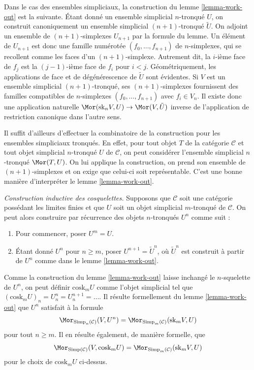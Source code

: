 \begin{remark}
\label{remark-cosk-simplicial-sets}
Dans le cas des ensembles simpliciaux, la construction du lemme
\ref{lemma-work-out} est la suivante. Étant donné un ensemble simplicial
$n$-tronqué $U$, on construit canoniquement un ensemble simplicial
$(n + 1)$-tronqué $\tilde U$. On adjoint un ensemble de
$(n + 1)$-simplexes $U_{n + 1}$ par la formule du lemme. Un élément de
$U_{n + 1}$
est donc une famille numérotée $(f_0, \ldots, f_{n + 1})$ de
$n$-simplexes, qui se recollent comme les faces d'un
$(n + 1)$-simplexe. Autrement dit, la $i$-ième face de $f_j$ est la
$(j-1)$-ième face de $f_i$ pour $i < j$. Géométriquement, les
applications de face et de dégénérescence de $\tilde U$ sont évidentes.
Si $V$ est un ensemble simplicial $(n + 1)$-tronqué, ses
$(n + 1)$-simplexes fournissent des familles compatibles de $n$-simplexes
$(f_0, \ldots, f_{n + 1})$ avec $f_i \in V_n$. Il existe donc une
application naturelle
$\Mor(\text{sk}_nV, U) \to \Mor(V, \tilde U)$
inverse de l'application de restriction canonique dans l'autre sens.

\medskip\noindent
Il suffit d'ailleurs d'effectuer la combinatoire de la construction pour
les ensembles simpliciaux tronqués. En effet, pour tout objet $T$ de la
catégorie $\mathcal{C}$ et tout objet simplicial $n$-tronqué $U$ de
$\mathcal{C}$, on peut considérer l'ensemble simplicial $n$-tronqué
$\Mor(T, U)$. On lui applique la construction, on prend son ensemble de
$(n + 1)$-simplexes et on exige que celui-ci soit représentable. C'est une
bonne manière d'interpréter le lemme \ref{lemma-work-out}.
\end{remark}

\begin{remark}
\label{remark-inductive-coskeleton}
{\it Construction inductive des cosquelettes.}
Supposons que $\mathcal{C}$ soit une catégorie possédant les limites
finies et que $U$ soit un objet simplicial $m$-tronqué de $\mathcal{C}$.
On peut alors construire par récurrence des objets $n$-tronqués $U^n$
comme suit :
\begin{enumerate}
\item Pour commencer, poser $U^m = U$.
\item Étant donné $U^n$ pour $n \geq m$, poser
$U^{n + 1} = \tilde U^n$, où $\tilde U^n$ est construit à partir de
$U^n$ comme dans le lemme \ref{lemma-work-out}.
\end{enumerate}
Comme la construction du lemme \ref{lemma-work-out} laisse inchangé le
$n$-squelette de $U^n$, on peut définir $\text{cosk}_m U$ comme l'objet
simplicial tel que
$(\text{cosk}_m U)_n = U^n_n = U^{n + 1}_n = \ldots$.
Il résulte formellement du lemme \ref{lemma-work-out} que $U^n$ satisfait
à la formule
$$
\Mor_{\text{Simp}_n(\mathcal{C})}(V, U^n)
=
\Mor_{\text{Simp}_m(\mathcal{C})}(\text{sk}_mV, U)
$$
pour tout $n \geq m$. Il en résulte également, de manière formelle, que
$$
\Mor_{\text{Simp}(\mathcal{C})}(V, \text{cosk}_mU)
=
\Mor_{\text{Simp}_m(\mathcal{C})}(\text{sk}_mV, U)
$$
pour le choix de $\text{cosk}_mU$ ci-dessus.
\end{remark}

